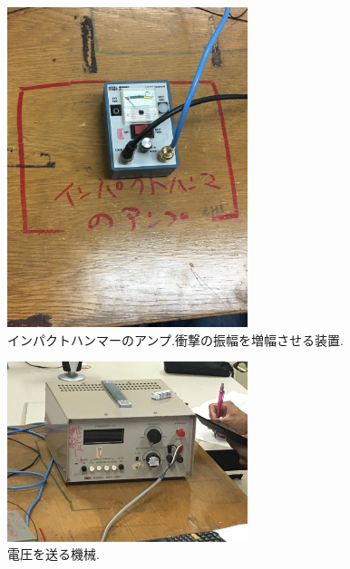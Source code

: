 \documentclass[twocolumn, 10pt,a4j]{jsarticle}
\begin{document}
  \begin{figure}[H]
    \begin{center}
      \includegraphics[width=7cm]{../img/IMG_3028.JPG}
      \caption{インパクトハンマーのアンプ.衝撃の振幅を増幅させる装置.}
    \end{center}
  \end{figure}

  \begin{figure}[H]
    \begin{center}
      \includegraphics[width=7cm]{../img/IMG_3024.JPG}
      \caption{電圧を送る機械.}
    \end{center}
  \end{figure}
\end{document}
